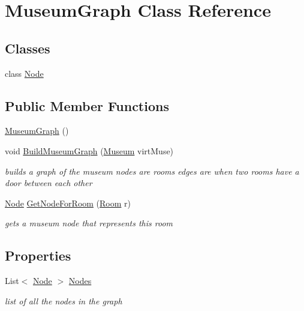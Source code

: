 \hypertarget{class_museum_graph}{}\section{Museum\+Graph Class Reference}
\label{class_museum_graph}
\subsection*{Classes}
\begin{DoxyCompactItemize}
\item 
class \mbox{\hyperlink{class_museum_graph_1_1_node}{Node}}
\end{DoxyCompactItemize}
\subsection*{Public Member Functions}
\begin{DoxyCompactItemize}
\item 
\mbox{\hyperlink{class_museum_graph_a36c6cda2e0045c0d501e6c1c5dc286bf}{Museum\+Graph}} ()
\item 
void \mbox{\hyperlink{class_museum_graph_a36a26248bb9c304f8e67c60eb6d517f5}{Build\+Museum\+Graph}} (\mbox{\hyperlink{class_museum}{Museum}} virt\+Muse)
\begin{DoxyCompactList}\small\item\em builds a graph of the museum nodes are rooms edges are when two rooms have a door between each other \end{DoxyCompactList}\item 
\mbox{\hyperlink{class_museum_graph_1_1_node}{Node}} \mbox{\hyperlink{class_museum_graph_a82509a5eb8dd2020aaee17261bedb974}{Get\+Node\+For\+Room}} (\mbox{\hyperlink{class_room}{Room}} r)
\begin{DoxyCompactList}\small\item\em gets a museum node that represents this room \end{DoxyCompactList}\end{DoxyCompactItemize}
\subsection*{Properties}
\begin{DoxyCompactItemize}
\item 
List$<$ \mbox{\hyperlink{class_museum_graph_1_1_node}{Node}} $>$ \mbox{\hyperlink{class_museum_graph_aa166ad4620069c3aaa4b87fd3ae4bfd7}{Nodes}}
\begin{DoxyCompactList}\small\item\em list of all the nodes in the graph \end{DoxyCompactList}\end{DoxyCompactItemize}
